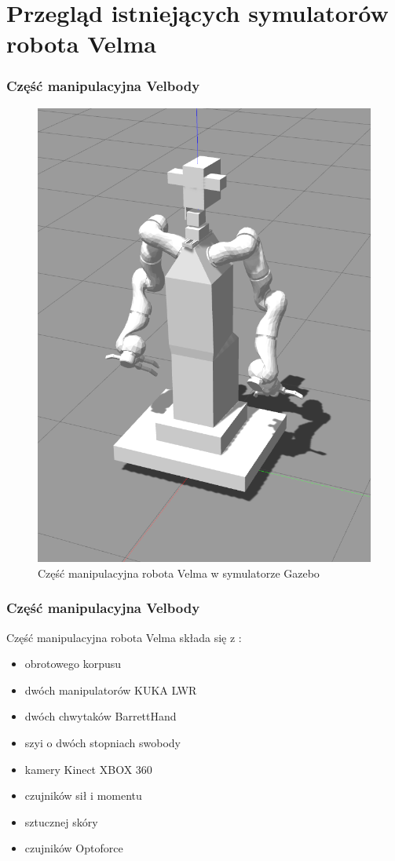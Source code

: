 \section{Przegląd istniejących symulatorów robota Velma} 

\begin{frame}
    \frametitle{Część manipulacyjna Velbody}
    \begin{figure}
        \includegraphics[scale=0.20]{./images/velma_gz_cropped.png}
        \caption{\normalsize{Część manipulacyjna robota Velma w symulatorze Gazebo}}
    \end{figure}
\end{frame}

\begin{frame}
    \frametitle{Część manipulacyjna Velbody}
    Część manipulacyjna robota Velma składa się z \cite{docsVelma}:  
    \begin{itemize}
        \item obrotowego korpusu
        \item dwóch manipulatorów KUKA LWR
        \item dwóch chwytaków BarrettHand
        \item szyi o dwóch stopniach swobody
        \item kamery Kinect XBOX 360
        \item czujników sił i momentu
        \item sztucznej skóry
        \item czujników Optoforce
    \end{itemize}
\end{frame}

